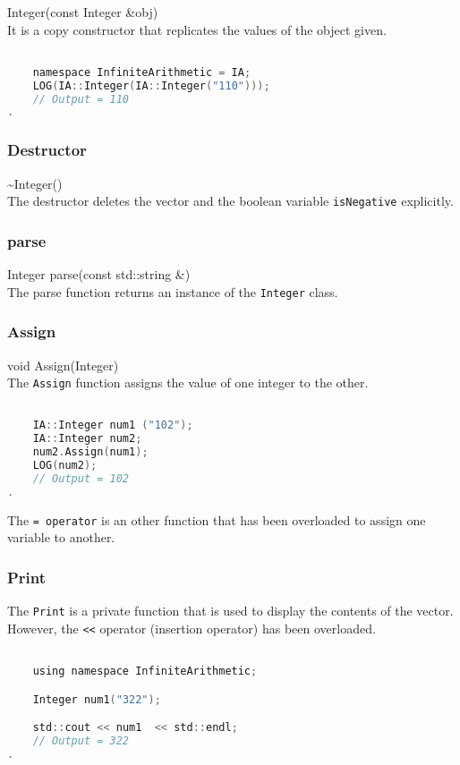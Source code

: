 \noindent
{\ttfamily \large Integer(const Integer \&obj)} \\[2mm]
It is a copy constructor that replicates the values of the object given.
\vspace*{1em}
\begin{lstlisting}[language = C]

	namespace InfiniteArithmetic = IA;
	LOG(IA::Integer(IA::Integer("110")));
	// Output = 110
.
\end{lstlisting}
\vspace*{1em}


\subsubsection{Destructor}  \vspace*{0.5em}

{\ttfamily \large \~{}Integer()} \\[2mm]
The destructor deletes the vector and the boolean variable \verb|isNegative| explicitly.


\subsubsection{parse} 

{\ttfamily \large Integer parse(const std::string \&)} \\[2mm]
The parse function returns an instance of the \verb|Integer| class.

\subsubsection{Assign}  
{\ttfamily \large void Assign(Integer)} \\[2mm]
The \verb|Assign| function assigns the value of one integer to the other.
\vspace*{1em}
\begin{lstlisting}[language = C]	

	IA::Integer num1 ("102");
	IA::Integer num2;
	num2.Assign(num1);
	LOG(num2);
	// Output = 102
.
\end{lstlisting}
\vspace*{1em}

The \verb|= operator| is an other function that has been overloaded to assign one variable to another.


\subsubsection{Print}
The \verb|Print| is a private function that is used to display the contents of the vector. \\
However, the \verb|<<| operator (insertion operator) has been overloaded.
\vspace*{1em}
\begin{lstlisting}[language = C]

	using namespace InfiniteArithmetic;

	Integer num1("322");

	std::cout << num1  << std::endl; 
	// Output = 322
.
\end{lstlisting}
\vspace*{1em}

